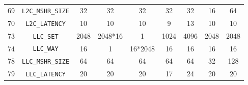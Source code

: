 \documentclass[11pt, swedish, openany]{book}
\begin{document}
\begin{table}[H]
\begin{tabular}{||c|c||c||c|c||c|c||c|c||}
        69                    & \texttt{L2C\_MSHR\_SIZE}   & 32                        & 32      & 32          & 32      & 32      & 16      & 64      \\
        70                    & \texttt{L2C\_LATENCY}      & 10                        & 10      & 10          & 9       & 13      & 10      & 10      \\
        \hline
        73                    & \texttt{LLC\_SET}          & 2048                      & 2048*16 & 1           & 1024    & 4096    & 2048    & 2048    \\
        74                    & \texttt{LLC\_WAY}          & 16                        & 1       & 16*2048     & 16      & 16      & 16      & 16      \\
        78                    & \texttt{LLC\_MSHR\_SIZE}   & 64                        & 64      & 64          & 64      & 64      & 32      & 128     \\
        79                    & \texttt{LLC\_LATENCY}      & 20                        & 20      & 20          & 17      & 24      & 20      & 20      \\
        \hline
    \end{tabular}
\end{table}
\end{document}
